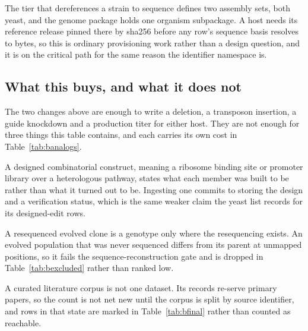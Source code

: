  The tier that dereferences a
strain to sequence defines two assembly sets, both yeast, and the genome package holds
one organism subpackage. A host needs its reference release pinned there by sha256 before
any row's sequence basis resolves to bytes, so this is ordinary provisioning work rather
than a design question, and it is on the critical path for the same reason the identifier
namespace is.

\subsection{What this buys, and what it does not}\label{sec:schema-scope}

The two changes above are enough to write a deletion, a transposon insertion, a guide
knockdown and a production titer for either host. They are not enough for three things
this table contains, and each carries its own cost in Table~\ref{tab:banalogs}.

A designed combinatorial construct, meaning a ribosome binding site or promoter library
over a heterologous pathway, states what each member was built to be rather than what it
turned out to be. Ingesting one commits to storing the design and a verification status,
which is the same weaker claim the yeast list records for its designed-edit rows.

A resequenced evolved clone is a genotype only where the resequencing exists. An evolved
population that was never sequenced differs from its parent at unmapped positions, so it
fails the sequence-reconstruction gate and is dropped in Table~\ref{tab:bexcluded} rather
than ranked low.

A curated literature corpus is not one dataset. Its records re-serve primary papers, so
the count is not net new until the corpus is split by source identifier, and rows in that
state are marked in Table~\ref{tab:bfinal} rather than counted as reachable.
